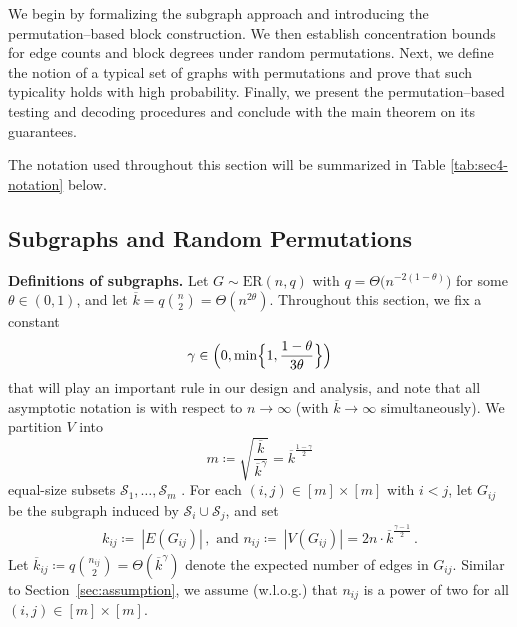 \documentclass[journal]{IEEEtran}
\theoremstyle{definition}
\theoremstyle{definition}
\newcommand{\ER}{\mathrm{ER}}
\newcommand{\kb}{\overline{k}}
\begin{document}
We begin by formalizing the subgraph approach and introducing the permutation--based block construction. We then establish concentration bounds for edge counts and block degrees under random permutations. Next, we define the notion of a typical set of graphs with permutations and prove that such typicality holds with high probability. Finally, we present the permutation--based testing and decoding procedures and conclude with the main theorem on its guarantees. 

The notation used throughout this section will be summarized in Table \ref{tab:sec4-notation} below.


\subsection{Subgraphs and Random Permutations} \label{sec:subgraphs}

\textbf{Definitions of subgraphs.} Let \(G\sim \ER(n,q)\) with \(q=\Theta \big(n^{-2(1-\theta)}\big)\) for some \(\theta\in(0,1)\), and let \(\kb= q\binom{n}{2} =\Theta(n^{2\theta})\). 
Throughout this section, we fix a constant
\[
\gamma\in\Bigl(0,\min\Bigl\{1,\frac{1-\theta}{3\theta}\Bigr\}\Bigr)
\]
that will play an important rule in our design and analysis, and note that all asymptotic notation is with respect to \(n \to \infty\) (with \(\kb \to \infty\) simultaneously).
We partition \(V\) into
\[
m \coloneqq \sqrt{\frac{\kb}{\kb^\gamma}} = \kb^{\frac{1-\gamma}{2}}
\]
equal-size subsets \(\mathcal{S}_1,\dots,\mathcal{S}_m\)
. For each \((i,j) \in [m] \times [m] \) with \(i<j\), let \(G_{ij}\) be the subgraph induced by \(\mathcal{S}_i\cup \mathcal{S}_j\), and set
\begin{align*}
  k_{ij} \coloneqq\ |E(G_{ij})| \, , \text{ and } 
  n_{ij} \coloneqq\ |V(G_{ij})| = 2n \cdot \kb^{\frac{\gamma-1}{2}} \, .
\end{align*}
Let \(\kb_{ij} \coloneqq q\binom{n_{ij}}{2} = \Theta(\kb^{\gamma})\) denote the expected number of edges in \(G_{ij}\). Similar to Section~\ref{sec:assumption}, we assume (w.l.o.g.) that \(n_{ij}\) is a power of two for all \((i,j)\in[m] \times [m]\).  
\end{document}
